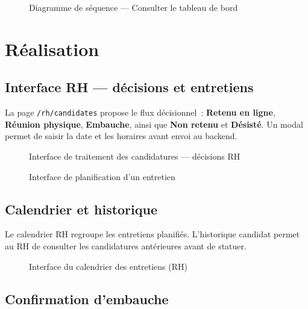 \begin{figure}[H]
  \centering
  \caption{Diagramme de séquence --- Consulter le tableau de bord}
  \label{fig:seq-dashboard}
\end{figure}


\section{Réalisation}

\subsection{Interface RH --- décisions et entretiens}

La page \texttt{/rh/candidates} propose le flux décisionnel~: \textbf{Retenu
en ligne}, \textbf{Réunion physique}, \textbf{Embauche}, ainsi que
\textbf{Non retenu} et \textbf{Désisté}. Un modal permet de saisir la date
et les horaires avant envoi au backend.

\begin{figure}[H]
  \centering
  \caption{Interface de traitement des candidatures --- décisions RH}
  \label{fig:ui-rh-decisions}
\end{figure}

\begin{figure}[H]
  \centering
  \caption{Interface de planification d'un entretien}
  \label{fig:ui-interview-modal}
\end{figure}


\subsection{Calendrier et historique}

Le calendrier RH regroupe les entretiens planifiés. L'historique candidat
permet au RH de consulter les candidatures antérieures avant de statuer.

\begin{figure}[H]
  \centering
  \caption{Interface du calendrier des entretiens (RH)}
  \label{fig:ui-calendar}
\end{figure}


\subsection{Confirmation d'embauche}

